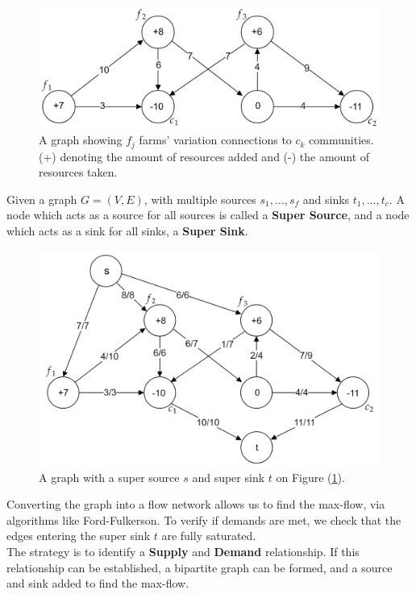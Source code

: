 \begin{figure}[h]
    \centering
    \includegraphics[width=.6\textwidth]{Sections/net/farm.png}
    \caption{A graph showing $f_j$ farms' variation connections to $c_k$ communities. (+) denoting the amount of 
    resources added and (-) the amount of resources taken.}
    \label{fig:farm}
\end{figure}

\begin{Def}

    Given a graph $G=(V,E)$, with multiple sources $s_1,\dots,s_f$ and sinks $t_1,\dots,t_c$. A node 
    which acts as a source for all sources is called a \textbf{Super Source}, and a node which acts as a sink for all sinks, a \textbf{Super Sink}.
\end{Def}

\begin{figure}[h]
    \centering
    \includegraphics[width=.6\textwidth]{Sections/net/farmres.png}
    \caption{A graph with a super source $s$ and super sink $t$ on Figure (\ref{fig:farm}).}
\end{figure}

\vspace{-1em}
\noindent
Converting the graph into a flow network allows us to find the max-flow, via algorithms like Ford-Fulkerson. To verify
if demands are met, we check that the edges entering the super sink $t$ are fully saturated.\\

\noindent
The strategy is to identify a \textbf{Supply} and \textbf{Demand} relationship. If this relationship can be established, 
a bipartite graph can be formed, and a source and sink added to find the max-flow.

